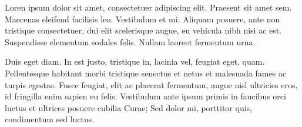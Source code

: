 \documentclass[twocolumn,twoside,10pt,a4paper]{article}
\begin{document}
Loren ipsum dolor sit amet, consectetuer adipiscing elit. 
Praesent sit amet sem. Maecenas eleifend facilisis leo. Vestibulum et
mi. Aliquam posuere, ante non tristique consectetuer, dui elit
scelerisque augue, eu vehicula nibh nisi ac est. Suspendisse elementum
sodales felis. Nullam laoreet fermentum urna. 

Duis eget diam. In est justo, tristique in, lacinia vel, feugiat eget,
quam. Pellentesque habitant morbi tristique senectus et netus et
malesuada fames ac turpis egestas. Fusce feugiat, elit ac placerat
fermentum, augue nisl ultricies eros, id fringilla enim sapien eu
felis. Vestibulum ante ipsum primis in faucibus orci luctus et
ultrices posuere cubilia Curae; Sed dolor mi, porttitor quis,
condimentum sed luctus. 

\renewcommand{\bibname}{Referências}
%
%

%

\end{document}
